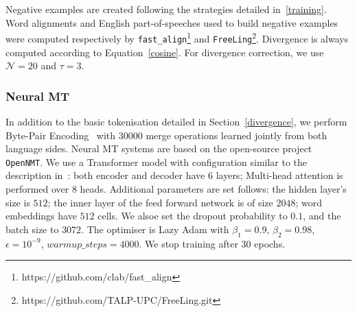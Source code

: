 \documentclass[11pt,a4paper]{article}
\begin{document}
Negative examples are created following the strategies detailed in~\ref{training}.
Word alignments and English part-of-speeches used to build negative
examples were computed respectively by \texttt{fast\_align}\footnote{https://github.com/clab/fast\_align} and \texttt{FreeLing}\footnote{https://github.com/TALP-UPC/FreeLing.git}.
Divergence is always computed according to Equation~\eqref{cosine}. 
For divergence correction, we use $\mathcal{N}=20$ and $\tau=3$.

\subsubsection{Neural MT}
\label{translation}

In addition to the basic tokenisation detailed in Section~\ref{divergence}, we perform Byte-Pair Encoding~\cite{Sennrich2016} with $30000$ merge operations learned jointly from both language sides.
Neural MT systems are based on the open-source project  \texttt{OpenNMT}. 
We use a Transformer model with configuration similar to the
description in~\cite{vaswani2017attention}: both encoder and decoder
have $6$ layers; Multi-head attention is performed over $8$
heads. Additional parameters are set follows:
the hidden layer's size is $512$; the inner layer of the feed forward network is of size $2048$;
word embeddings have $512$ cells. We alsoe set the dropout probability
to $0.1$, and the batch size to $3072$.
The optimiser is Lazy Adam with $\beta_1 = 0.9$, $\beta_2 = 0.98$, $\epsilon = 10^{-9}$, $warmup\_steps = 4000$. We stop training after $30$ epochs.

\end{document}
